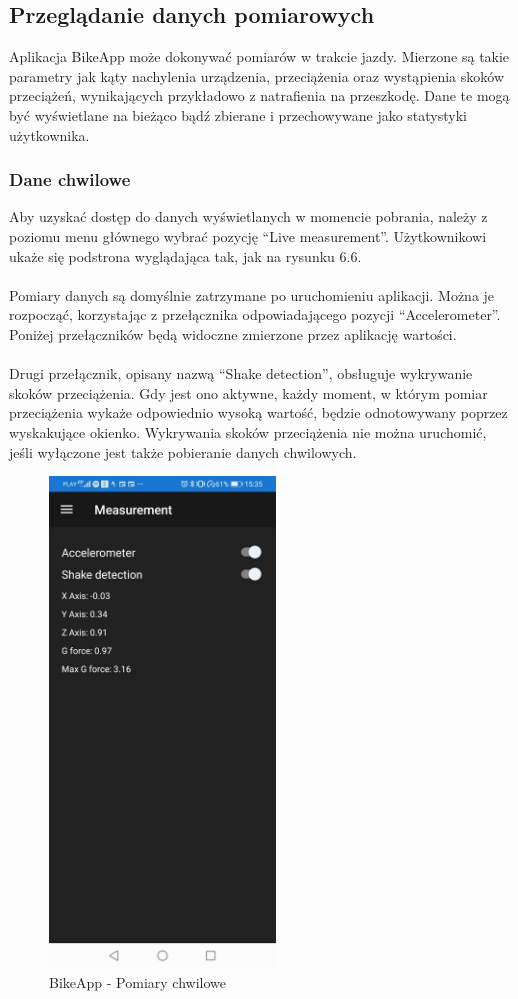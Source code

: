 \subsection{Przeglądanie danych pomiarowych} %
Aplikacja BikeApp może dokonywać pomiarów w trakcie jazdy. Mierzone są takie parametry jak kąty nachylenia urządzenia, przeciążenia oraz wystąpienia skoków przeciążeń, wynikających przykładowo z natrafienia na przeszkodę. Dane te mogą być wyświetlane na bieżąco bądź zbierane i przechowywane jako statystyki użytkownika.

\subsubsection{Dane chwilowe} %
Aby uzyskać dostęp do danych wyświetlanych w momencie pobrania, należy z poziomu menu głównego wybrać pozycję ``Live measurement''. Użytkownikowi ukaże się podstrona wyglądająca tak, jak na rysunku 6.6.\\
\\
Pomiary danych są domyślnie zatrzymane po uruchomieniu aplikacji. Można je rozpocząć, korzystając z przełącznika odpowiadającego pozycji ``Accelerometer''. Poniżej przełączników będą widoczne zmierzone przez aplikację wartości.\\
\\
Drugi przełącznik, opisany nazwą ``Shake detection'', obsługuje wykrywanie skoków przeciążenia. Gdy jest ono aktywne, każdy moment, w którym pomiar przeciążenia wykaże odpowiednio wysoką wartość, będzie odnotowywany poprzez wyskakujące okienko. Wykrywania skoków przeciążenia nie można uruchomić, jeśli wyłączone jest także pobieranie danych chwilowych.

\begin{figure}[!htb]
	\begin{center}
		\includegraphics[width=6cm]{rys/instructions-measurement.jpg}
		\caption{BikeApp - Pomiary chwilowe}
		\label{rys:BikeApp - Pomiary chwilowe}
	\end{center}
\end{figure}

